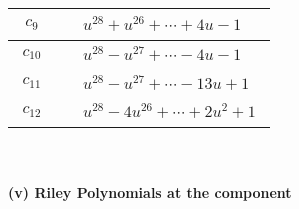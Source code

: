 \documentclass[1p]{elsarticle_modified}
\theoremstyle{definition}
\begin{document}
\begin{tabular}{m{50pt}|m{274pt}}
\hline $$\begin{aligned}c_{9}\end{aligned}$$&$\begin{aligned}
&u^{28}+u^{26}+\cdots+4 u-1
\end{aligned}$\\
\hline $$\begin{aligned}c_{10}\end{aligned}$$&$\begin{aligned}
&u^{28}- u^{27}+\cdots-4 u-1
\end{aligned}$\\
\hline $$\begin{aligned}c_{11}\end{aligned}$$&$\begin{aligned}
&u^{28}- u^{27}+\cdots-13 u+1
\end{aligned}$\\
\hline $$\begin{aligned}c_{12}\end{aligned}$$&$\begin{aligned}
&u^{28}-4 u^{26}+\cdots+2 u^2+1
\end{aligned}$\\
\hline
\end{tabular}\\~\\
\newpage\renewcommand{\arraystretch}{1}
\flushleft \textbf{(v) Riley Polynomials at the component}\newline \\
\end{document}

